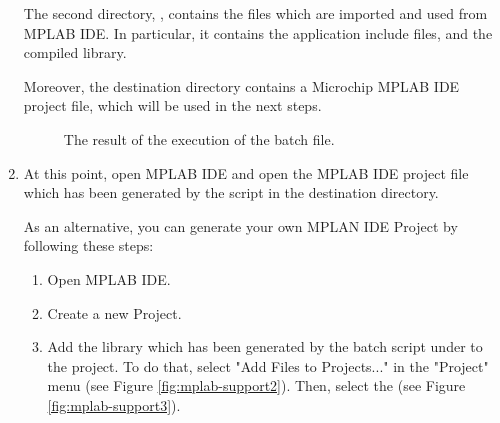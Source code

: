 \begin{enumerate}
  The second directory, , contains the files which are
  imported and used from MPLAB IDE. In particular, it contains the
  application include files, and the compiled library.

  Moreover, the destination directory contains a Microchip MPLAB IDE
  project file, which will be used in the next steps.

%
\begin{figure}[htb]
\caption{The result of the execution of the  batch file.}
\label{fig:mplab-support1}
\end{figure}

\item
  At this point, open MPLAB IDE and open the MPLAB IDE project file
  which has been generated by the script in the destination
  directory. 

  As an alternative, you can generate your own MPLAN IDE
  Project by following these steps:

  \begin{enumerate}
  \item 
    Open MPLAB IDE.

  \item
    Create a new Project.

  \item
    Add the  library which has been generated by the
    batch script under  to the
    project. To do that, select "Add Files to Projects..." in the
    "Project" menu (see Figure \ref{fig:mplab-support2}). Then, select
    the  (see Figure
    \ref{fig:mplab-support3}).


\end{enumerate}
\end{enumerate}
